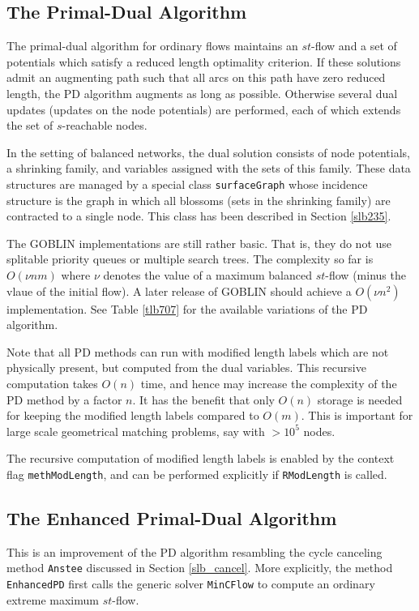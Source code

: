\documentclass[a4paper,11pt,twoside]{book}
\begin{document}
\begin{multicols}{2}
\subsection{The Primal-Dual Algorithm}
The primal-dual algorithm for ordinary flows maintains an $st$-flow and a set
of potentials which satisfy a reduced length optimality criterion. If these
solutions admit an augmenting path such that all arcs on this path have zero
reduced length, the PD algorithm augments as long as possible. Otherwise
several dual updates (updates on the node potentials) are performed,
each of which extends the set of $s$-reachable nodes.

In the setting of balanced networks, the dual solution consists of node
potentials, a shrinking family, and variables assigned with the sets of this
family. These data structures are managed by a special class
\verb/surfaceGraph/ whose incidence structure is the graph in which all blossoms
(sets in the shrinking family) are contracted to a single node. This class has
been described in Section \ref{slb235}.

The GOBLIN implementations are still rather basic. That is, they do not use
splitable priority queues or multiple search trees. The complexity so far is
$O(\nu nm)$ where $\nu$ denotes the value of a maximum balanced $st$-flow (minus
the vlaue of the initial flow). A later release of GOBLIN should achieve a
$O(\nu n^2)$ implementation. See Table \ref{tlb707} for the available variations
of the PD algorithm.

Note that all PD methods can run with modified length labels which are not
physically present, but computed from the dual variables. This recursive
computation takes $O(n)$ time, and hence may increase the complexity of the PD
method by a factor $n$. It has the benefit that only $O(n)$ storage is needed
for keeping the modified length labels compared to $O(m)$. This is important
for large scale geometrical matching problems, say with $>10^5$ nodes.

The recursive computation of modified length labels is enabled by the context
flag \verb/methModLength/, and can be performed explicitly if \verb/RModLength/
is called.


\subsection{The Enhanced Primal-Dual Algorithm}
\label{slb_enhanced}
This is an improvement of the PD algorithm resambling the cycle
canceling method \verb/Anstee/ discussed in Section \ref{slb_cancel}.
More explicitly, the method \verb/EnhancedPD/ first calls the generic solver
\verb/MinCFlow/ to compute an ordinary extreme maximum $st$-flow.


\end{multicols}
\end{document}
